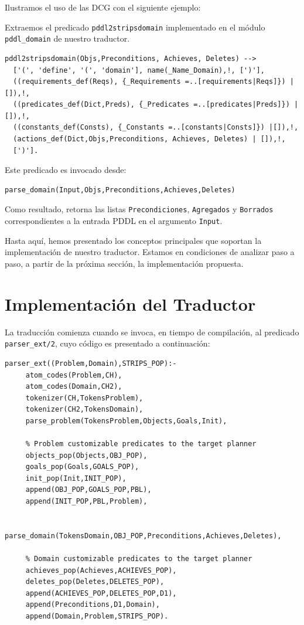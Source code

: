         Ilustramos el uso de las DCG con el siguiente ejemplo:
	
        \begin{ejemplo}
        Extraemos el predicado \texttt{pddl2stripsdomain} implementado en el
        m\'odulo \texttt{pddl\_domain} de nuestro traductor.

	\begin{verbatim}
pddl2stripsdomain(Objs,Preconditions, Achieves, Deletes) --> 
  ['(', 'define', '(', 'domain'], name(_Name_Domain),!, [')'], 
  ((requirements_def(Reqs), {_Requirements =..[requirements|Reqs]}) | []),!, 
  ((predicates_def(Dict,Preds), {_Predicates =..[predicates|Preds]}) | []),!, 
  ((constants_def(Consts), {_Constants =..[constants|Consts]}) |[]),!,
  (actions_def(Dict,Objs,Preconditions, Achieves, Deletes) | []),!,
  [')'].
	\end{verbatim}

	Este predicado es invocado desde:
	
	\begin{verbatim}
parse_domain(Input,Objs,Preconditions,Achieves,Deletes)
	\end{verbatim}
	
	Como resultado, retorna las listas
        \texttt{Precondiciones}, \texttt{Agregados} y \texttt{Borrados} 
	co\-rres\-pon\-dien\-tes a la entrada PDDL en el argumento \texttt{Input}.
	\end{ejemplo}
	
        Hasta aqu\'i, hemos presentado los conceptos principales que soportan la
        implementaci\'on de nuestro traductor. Estamos en condiciones
        de analizar paso a paso, a partir de la pr\'oxima secci\'on, la
        implementaci\'on propuesta.

\section{Implementaci\'on del Traductor} \label{cap6:implementacion}

La traducci\'on comienza cuando se invoca, en tiempo de compilaci\'on, 
al predicado \texttt{parser\_ext/2}, cuyo c\'odigo es presentado a
continuaci\'on:

        \begin{verbatim}
parser_ext((Problem,Domain),STRIPS_POP):-
     atom_codes(Problem,CH),
     atom_codes(Domain,CH2),
     tokenizer(CH,TokensProblem),
     tokenizer(CH2,TokensDomain),
     parse_problem(TokensProblem,Objects,Goals,Init),
        
     % Problem customizable predicates to the target planner
     objects_pop(Objects,OBJ_POP),
     goals_pop(Goals,GOALS_POP),
     init_pop(Init,INIT_POP),
     append(OBJ_POP,GOALS_POP,PBL),
     append(INIT_POP,PBL,Problem),

     parse_domain(TokensDomain,OBJ_POP,Preconditions,Achieves,Deletes),

     % Domain customizable predicates to the target planner
     achieves_pop(Achieves,ACHIEVES_POP),
     deletes_pop(Deletes,DELETES_POP),
     append(ACHIEVES_POP,DELETES_POP,D1),
     append(Preconditions,D1,Domain),
     append(Domain,Problem,STRIPS_POP).
        \end{verbatim}


